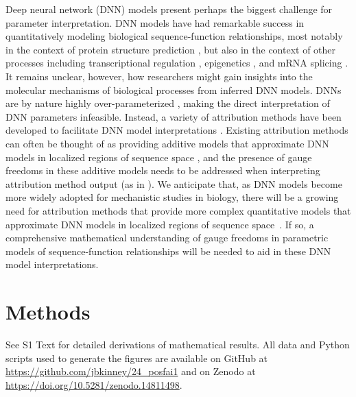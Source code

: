 \documentclass[10pt,letterpaper]{article}
\begin{document}
Deep neural network (DNN) models present perhaps the biggest challenge  for parameter interpretation. DNN models have had remarkable success in  quantitatively modeling biological sequence-function relationships, most notably in  the context of protein structure prediction \cite{jumper2021highly, lin2023evolutionary}, but also in the  context of other processes including transcriptional regulation \cite{avsec2021effective, karbalayghareh2022chromatin, de2022deepstarr},  epigenetics \cite{avsec2021base, chen2022sequence, toneyan2022evaluating}, and mRNA splicing \cite{jaganathan2019predicting, cheng2021mtsplice}. It remains unclear,  however, how researchers might gain insights into the molecular mechanisms of biological  processes from inferred DNN models. DNNs are by nature highly  over-parameterized \cite{raghu2017expressive, kaplan2020scaling, nakkiran2021deep}, making the direct interpretation of DNN  parameters infeasible. Instead, a variety of attribution methods have  been developed to facilitate DNN model interpretations \cite{simonyan2013deep, shrikumar2017learning, lundberg2017unified, jha2020enhanced}. Existing  attribution methods can often be thought of as providing additive models  that approximate DNN models in localized regions of sequence space \cite{han2022explanation}, and  the presence of gauge freedoms in these additive models needs to be addressed when interpreting attribution method output (as in \cite{majdandzic2023correcting,sasse2023quick}). We  anticipate that, as DNN models become more widely adopted for mechanistic  studies in biology, there will be a growing need for attribution methods  that provide more complex quantitative models that approximate DNN models in localized regions of sequence space~\cite{seitz2023interpreting}. If so, a  comprehensive mathematical understanding of gauge freedoms in parametric  models of sequence-function relationships will be needed to aid  in these DNN model interpretations. 

\section*{Methods}

See S1 Text for detailed derivations of mathematical results. All data and Python scripts used to generate the figures are available on GitHub at \url{https://github.com/jbkinney/24_posfai1} and on Zenodo at \url{https://doi.org/10.5281/zenodo.14811498}. \\
\end{document}
